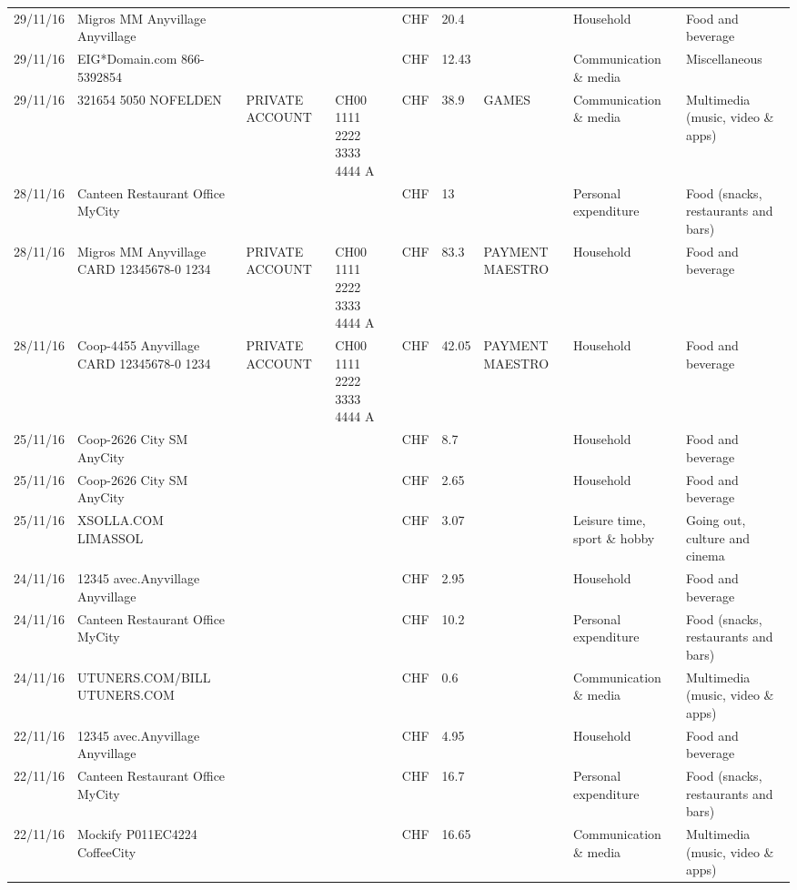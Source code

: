 \begin{landscape}
\begin{table}[t]
\begin{center}
\begin{tabular}{lllllllll}
		29/11/16 & Migros MM Anyvillage    Anyvillage &       &       & CHF   & 20.4  &       & Household & Food and beverage \\
		29/11/16 & EIG*Domain.com           866-5392854 &       &       & CHF   & 12.43 &       & Communication \& media & Miscellaneous \\
		29/11/16 & 321654 5050 NOFELDEN & PRIVATE ACCOUNT & CH00 1111 2222 3333 4444 A & CHF   & 38.9  & GAMES & Communication \& media & Multimedia (music, video \& apps) \\
		28/11/16 & Canteen Restaurant Office      MyCity &       &       & CHF   & 13    &       & Personal expenditure & Food (snacks, restaurants and bars) \\
		28/11/16 & Migros MM Anyvillage CARD 12345678-0 1234 & PRIVATE ACCOUNT & CH00 1111 2222 3333 4444 A & CHF   & 83.3  & PAYMENT MAESTRO & Household & Food and beverage \\
		28/11/16 & Coop-4455 Anyvillage CARD 12345678-0 1234 & PRIVATE ACCOUNT & CH00 1111 2222 3333 4444 A & CHF   & 42.05 & PAYMENT MAESTRO & Household & Food and beverage \\
		25/11/16 & Coop-2626 City SM        AnyCity &       &       & CHF   & 8.7   &       & Household & Food and beverage \\
		25/11/16 & Coop-2626 City SM        AnyCity &       &       & CHF   & 2.65  &       & Household & Food and beverage \\
		25/11/16 & XSOLLA.COM               LIMASSOL &       &       & CHF   & 3.07  &       & Leisure time, sport \& hobby & Going out, culture and cinema \\
		24/11/16 & 12345 avec.Anyvillage   Anyvillage &       &       & CHF   & 2.95  &       & Household & Food and beverage \\
		24/11/16 & Canteen Restaurant Office      MyCity &       &       & CHF   & 10.2  &       & Personal expenditure & Food (snacks, restaurants and bars) \\
		24/11/16 & UTUNERS.COM/BILL          UTUNERS.COM &       &       & CHF   & 0.6   &       & Communication \& media & Multimedia (music, video \& apps) \\
		22/11/16 & 12345 avec.Anyvillage   Anyvillage &       &       & CHF   & 4.95  &       & Household & Food and beverage \\
		22/11/16 & Canteen Restaurant Office      MyCity &       &       & CHF   & 16.7  &       & Personal expenditure & Food (snacks, restaurants and bars) \\
		22/11/16 & Mockify P011EC4224       CoffeeCity &       &       & CHF   & 16.65 &       & Communication \& media & Multimedia (music, video \& apps) \\

\end{tabular}
\end{center}
\end{table}
\end{landscape}
